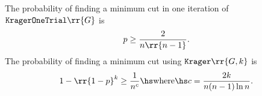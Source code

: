 \documentclass{article}
\begin{document}
\begin{theorem}
	\label{thm:krager-probabilities}
	The probability of finding a minimum cut in one iteration of $ \texttt{KragerOneTrial} \rr{ G }$
	is
	\begin{align*}
		p \geq \frac{2}{n \rr{ n-1 }}.
	\end{align*}
	The probability of finding a minimum cut using $ \texttt{Krager} \rr{ G,k }$ is
	\begin{align*}
		1-\rr{ 1-p }^k \geq \frac{1}{n^c} \hs \text{where} \hs c = \frac{2k}{n(n-1)\ln n}.
	\end{align*}
\end{theorem}
\end{document}
